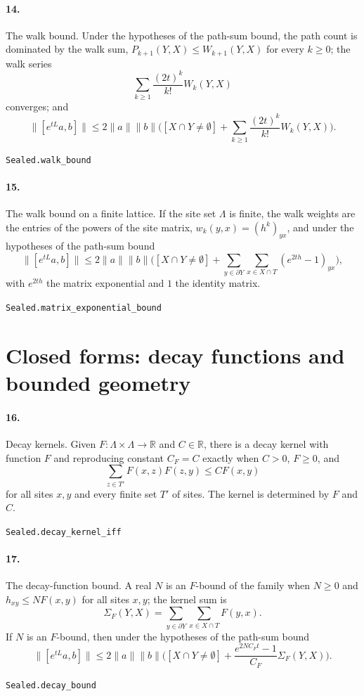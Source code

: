 \documentclass[11pt]{article}
\begin{document}
\paragraph{14.} The walk bound. Under the hypotheses of the path-sum bound, the path count is dominated by the walk sum, $P_{k+1}(Y, X) \le W_{k+1}(Y, X)$ for every $k \ge 0$; the walk series \[\sum_{k \ge 1} \frac{(2t)^k}{k!} W_k(Y, X)\] converges; and \[\|[e^{tL} a, b]\| \le 2\|a\|\|b\| \bigl([X \cap Y \ne \emptyset] + \sum_{k \ge 1} \frac{(2t)^k}{k!} W_k(Y, X)\bigr).\]\par{\footnotesize\texttt{Sealed.walk\_bound}}

\paragraph{15.} The walk bound on a finite lattice. If the site set $\Lambda$ is finite, the walk weights are the entries of the powers of the site matrix, $w_k(y, x) = (h^k)_{yx}$, and under the hypotheses of the path-sum bound \[\|[e^{tL} a, b]\| \le 2\|a\|\|b\| \bigl([X \cap Y \ne \emptyset] + \sum_{y \in \partial Y} \sum_{x \in X \cap T} (e^{2th} - 1)_{yx}\bigr),\] with $e^{2th}$ the matrix exponential and $1$ the identity matrix.\par{\footnotesize\texttt{Sealed.matrix\_exponential\_bound}}

\section*{Closed forms: decay functions and bounded geometry}
\paragraph{16.} Decay kernels. Given $F : \Lambda \times \Lambda \to \mathbb R$ and $C \in \mathbb R$, there is a decay kernel with function $F$ and reproducing constant $C_F = C$ exactly when $C > 0$, $F \ge 0$, and \[\sum_{z \in T'} F(x, z) F(z, y) \le C F(x, y)\] for all sites $x, y$ and every finite set $T'$ of sites. The kernel is determined by $F$ and $C$.\par{\footnotesize\texttt{Sealed.decay\_kernel\_iff}}

\paragraph{17.} The decay-function bound. A real $N$ is an $F$-bound of the family when $N \ge 0$ and $h_{xy} \le N F(x, y)$ for all sites $x, y$; the kernel sum is \[\Sigma_F(Y, X) = \sum_{y \in \partial Y} \sum_{x \in X \cap T} F(y, x).\] If $N$ is an $F$-bound, then under the hypotheses of the path-sum bound \[\|[e^{tL} a, b]\| \le 2\|a\|\|b\| \bigl([X \cap Y \ne \emptyset] + \frac{e^{2 N C_F t} - 1}{C_F} \Sigma_F(Y, X)\bigr).\]\par{\footnotesize\texttt{Sealed.decay\_bound}}
\end{document}

